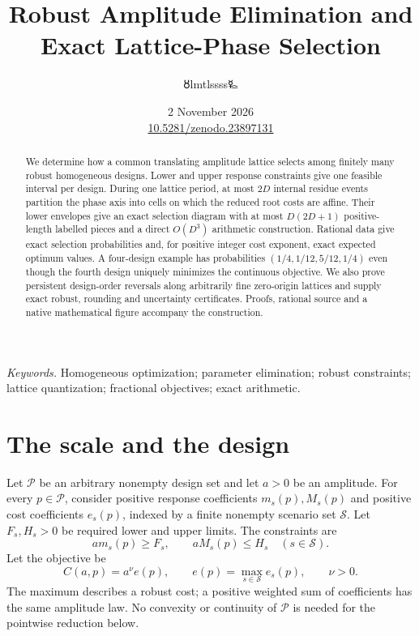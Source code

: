 \documentclass[11pt,a4paper]{article}
\title{\LARGE Robust Amplitude Elimination and\\Exact Lattice-Phase Selection}
\author{{\authorsymbol 🜘}lmtlssss{\authorsymbol 🜐}}
\date{2 November 2026\\[3pt]\small\href{https://doi.org/10.5281/zenodo.23897131}{10.5281/zenodo.23897131}}
\begin{document}
\maketitle\thispagestyle{plain}

\begin{abstract}
We determine how a common translating amplitude lattice selects among
finitely many robust homogeneous designs. Lower and upper response
constraints give one feasible interval per design. During one lattice
period, at most $2D$ internal residue events partition the phase axis
into cells on which the reduced root costs are affine. Their lower
envelopes give an exact selection diagram with at most $D(2D+1)$
positive-length labelled pieces and a direct $O(D^3)$ arithmetic
construction. Rational data give exact selection probabilities and,
for positive integer cost exponent, exact expected optimum values.
A four-design example has probabilities $(1/4,1/12,5/12,1/4)$ even though
the fourth design uniquely minimizes the continuous objective.
We also prove persistent design-order reversals along arbitrarily fine
zero-origin lattices and supply exact robust, rounding and uncertainty
certificates. Proofs, rational source and a native mathematical figure
accompany the construction.
\end{abstract}
\noindent\textit{Keywords.} Homogeneous optimization; parameter elimination;
robust constraints; lattice quantization; fractional objectives; exact arithmetic.

\section{The scale and the design}
Let $\mathcal P$ be an arbitrary nonempty design set and let $a>0$ be an
amplitude. For every $p\in\mathcal P$, consider positive response coefficients
$m_s(p),M_s(p)$ and positive cost coefficients $e_s(p)$, indexed by a finite
nonempty scenario set $\mathcal S$. Let $F_s,H_s>0$ be required lower and
upper limits. The constraints are
\begin{equation}\label{eq:constraints}
 a m_s(p)\ge F_s,\qquad a M_s(p)\le H_s
 \quad(s\in\mathcal S).
\end{equation}
Let the objective be
\begin{equation}\label{eq:cost}
 C(a,p)=a^\nu e(p),\qquad
 e(p)=\max_{s\in\mathcal S}e_s(p),\qquad \nu>0.
\end{equation}
The maximum describes a robust cost; a positive weighted sum of coefficients
has the same amplitude law. No convexity or continuity of $\mathcal P$ is
needed for the pointwise reduction below.
\end{document}
